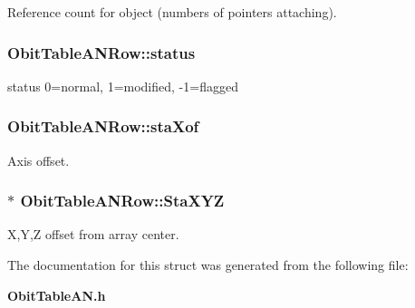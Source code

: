 Reference count for object (numbers of pointers attaching). 

\subsubsection{ {\bf Obit\-Table\-ANRow::status}}\label{structObitTableANRow_o18}


status 0=normal, 1=modified, -1=flagged 

\subsubsection{ {\bf Obit\-Table\-ANRow::sta\-Xof}}\label{structObitTableANRow_o8}


Axis offset. 

\subsubsection{$\ast$ {\bf Obit\-Table\-ANRow::Sta\-XYZ}}\label{structObitTableANRow_o12}


X,Y,Z offset from array center. 



The documentation for this struct was generated from the following file:\begin{CompactItemize}
\item 
{\bf Obit\-Table\-AN.h}\end{CompactItemize}
